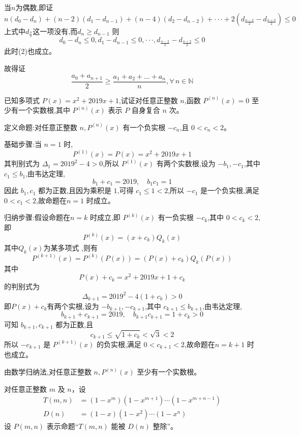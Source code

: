 \begin{questions}
\begin{solution}
        当$n$为偶数,即证 \[n(d_{0}-d_{n})+(n-2)(d_{1}-d_{n-1})+(n-4)(d_{2}-d_{n-2})+\cdot\cdot\cdot+2(d_{\frac{n-2}{2}}-d_{\frac{n+2}{2}})\le0\tag{2}\]
        上式中$d_{\frac{n}{2}}$这一项没有,而$d_{n}\ge d_{n-1}$
        则$$d_{0}-d_{n}\le0, d_{1}-d_{n-1}\le0,\cdot\cdot\cdot,d_{\frac{n-2}{2}}-d_{\frac{n+2}{2}}\le0$$ 此时(2)也成立。
        
        故得证 $$\frac{a_0+a_{n+1}}{2} \ge \frac{a_1+a_2+\dots+a_n}{n},\forall \,n\in \mathbb{N}$$
    \end{solution}

    \question 已知多项式 $P(x) = x^2 + 2019x + 1$,试证对任意正整数 $n$,函数 $P^{(n)}(x) = 0$ 至少有一个实数根,其中 $P^{(n)}(x)$ 表示 $P$ 自身复合 $n$ 次。
    \begin{solution}
        定义命题:对任意正整数 $n,P^{(n)}(x)$ 有一个负实根 $-c_n$,且 $0 < c_n < 2$。
        
        基础步骤:当 $n=1$ 时,
        \[
        P^{(1)}(x) = P(x) = x^2 + 2019x + 1
        \]
        其判别式为 $\Delta_1 = 2019^2 - 4 > 0$,所以 $P^{(1)}(x)$ 有两个实数根,设为 $-b_1, -c_1$,其中 $c_1 \le b_1$,由韦达定理,
        \[
        b_1 + c_1 = 2019,\quad b_1 c_1 = 1
        \]
        因此 $b_1, c_1$ 都为正数,且因为乘积是 $1$,可得 $c_1 \le 1 < 2$,所以 $-c_1$ 是一个负实根,满足 $0 < c_1 < 2$,故命题在$n=1$ 时成立。
        
        归纳步骤:假设命题在$n=k$ 时成立,即 $P^{(k)}(x)$ 有一负实根 $-c_k$,其中 $0 < c_k < 2$,即
        \[
        P^{(k)}(x) = (x + c_k) Q_k(x)
        \]
        其中$Q_k(x)$为某多项式 ,则有
        \[
        P^{(k+1)}(x) = P^{(k)}(P(x)) = (P(x) + c_k) Q_k(P(x))
        \]
        其中
        \[
        P(x) + c_k = x^2 + 2019x + 1 + c_k
        \]
        的判别式为
        \[
        \Delta_{k+1} = 2019^2 - 4(1 + c_k) > 0
        \]
        即$P(x) + c_k$有两个实根,设为 $-b_{k+1}, -c_{k+1}$,其中 $c_{k+1} \le b_{k+1}$,由韦达定理,
        \[
        b_{k+1} + c_{k+1} = 2019,\quad b_{k+1} c_{k+1} = 1 + c_k > 0
        \]
        可知 $b_{k+1}, c_{k+1}$ 都为正数,且
        \[
        c_{k+1} \le \sqrt{1 + c_k} < \sqrt{3} < 2
        \]
        所以 $-c_{k+1}$ 是 $P^{(k+1)}(x)$ 的负实根,满足 $0 < c_{k+1} < 2$,故命题在$n=k+1$ 时也成立。
        
        由数学归纳法,对任意正整数 $n,P^{(n)}(x)$ 至少有一个实数根。
    \end{solution}

    \question
对任意正整数 $m$ 及 $n$，设
\begin{align*}
T(m,n)&=(1-x^m)(1-x^{m+1})\cdots(1-x^{m+n-1})\\
D(n)&=(1-x)(1-x^2)\cdots(1-x^n)
\end{align*}
设 $P(m,n)$ 表示命题“$T(m,n)$ 能被 $D(n)$ 整除”。


\end{questions}
